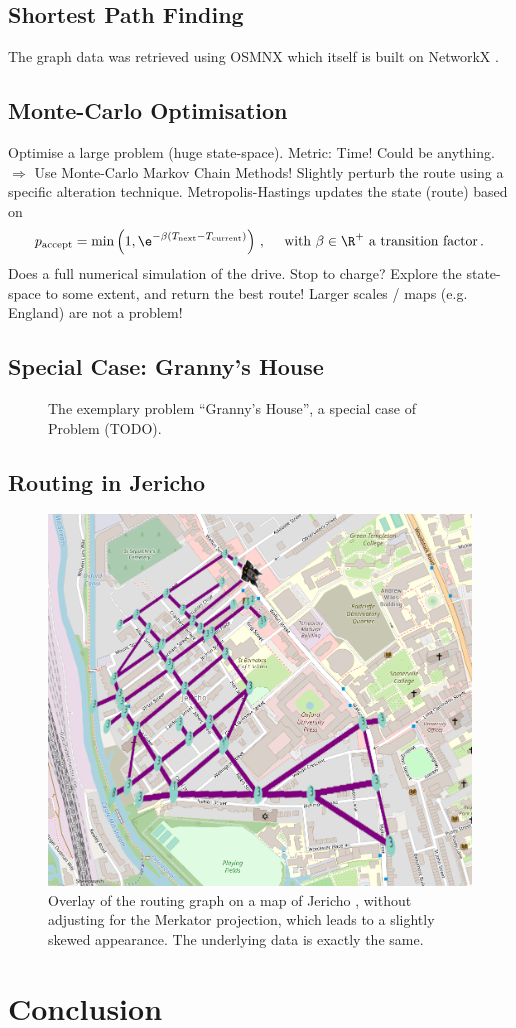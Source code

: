 \documentclass{prettytex/ox/mmsc-special-topic}
\begin{document}
  \subsection{Shortest Path Finding}
  The graph data was retrieved using OSMNX \parencite{osmnx} which itself is built on NetworkX \parencite{networkx}.

  \subsection{Monte-Carlo Optimisation}
  Optimise a large problem (huge state-space). Metric: Time! Could be anything.
  $\Rightarrow$ Use Monte-Carlo Markov Chain Methods!
  Slightly perturb the route using a specific alteration technique.
  Metropolis-Hastings updates the state (route) based on $$p_{\rm accept} = \min\left(1, \e^{-\beta (T_{\rm next} - T_{\rm current})}\right)\,, \quad \text{ with } \beta \in \R^+ \text{ a transition factor} \,.$$
  Does a full numerical simulation of the drive. Stop to charge?
  Explore the state-space to some extent, and return the best route!
  Larger scales / maps (e.g. England) are not a problem!

  \subsection{Special Case: Granny's House}
  \begin{figure}[H]
    \centering
    \caption{The exemplary problem ``Granny's House'', a special case of Problem (TODO).}
  \end{figure}

  \subsection{Routing in Jericho}
  \begin{figure}[H]
    \centering
    \includegraphics[width=0.6\linewidth]{figures/jericho.png}
    \caption{Overlay of the routing graph on a map of Jericho \parencite{osm}, without adjusting for the Merkator projection, which leads to a slightly skewed appearance. The underlying data is exactly the same.}
  \end{figure}

  \section{Conclusion}

  \pagebreak
  \printbibliography
\end{document}
